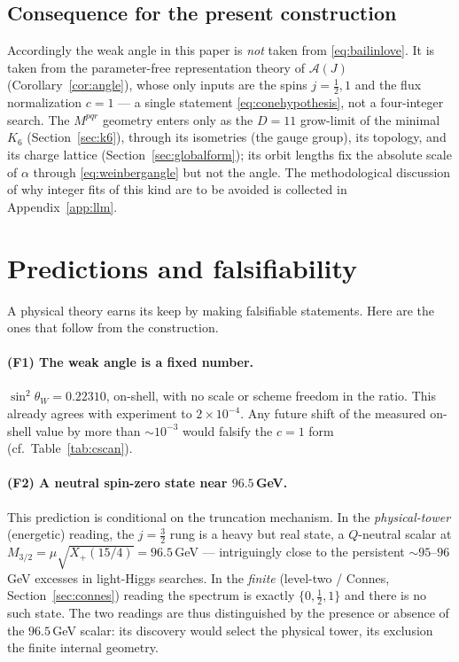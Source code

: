 \documentclass[11pt]{article}
\theoremstyle{plain}
\theoremstyle{definition}
\newcommand{\cA}{\mathcal{A}}
\newcommand{\Xp}{X_{+}}
\newcommand{\half}{\tfrac12}
\newcommand{\sinsq}{\sin^{2}\theta_W}
\begin{document}
\subsection{Consequence for the present construction}

Accordingly the weak angle in this paper is \emph{not} taken from
\eqref{eq:bailinlove}. It is taken from the parameter-free representation
theory of $\cA(J)$ (Corollary~\ref{cor:angle}), whose only inputs are the
spins $j=\half,1$ and the flux normalization $c=1$ --- a single statement
\eqref{eq:conehypothesis}, not a four-integer search. The $M^{pqr}$ geometry
enters only as the $D=11$ grow-limit of the minimal $K_6$
(Section~\ref{sec:k6}), through its isometries (the gauge group), its
topology, and its charge lattice
(Section~\ref{sec:globalform}); its orbit lengths fix the absolute scale of
$\alpha$ through \eqref{eq:weinbergangle} but not the angle. The methodological
discussion of why integer fits of this kind are to be avoided is collected in
Appendix~\ref{app:llm}.

\section{Predictions and falsifiability}
\label{sec:predictions}

A physical theory earns its keep by making falsifiable statements. Here are
the ones that follow from the construction.

\paragraph{(F1) The weak angle is a fixed number.}
$\sinsq=0.22310$, on-shell, with no scale or scheme freedom in the ratio.
This already agrees with experiment to $2\times10^{-4}$. Any future shift of
the measured on-shell value by more than $\sim10^{-3}$ would falsify the
$c=1$ form (cf.\ Table~\ref{tab:cscan}).

\paragraph{(F2) A neutral spin-zero state near $96.5\,$GeV.}
This prediction is conditional on the truncation mechanism. In the
\emph{physical-tower} (energetic) reading, the $j=\tfrac32$ rung is a heavy
but real state, a $Q$-neutral scalar at
$M_{3/2}=\mu\sqrt{\Xp(15/4)}=96.5\,$GeV --- intriguingly close to the
persistent $\sim95$--$96\,$GeV excesses in light-Higgs searches. In the
\emph{finite} (level-two / Connes, Section~\ref{sec:connes}) reading the
spectrum is exactly $\{0,\tfrac12,1\}$ and there is no such state. The two
readings are thus distinguished by the presence or absence of the $96.5\,$GeV
scalar: its discovery would select the physical tower, its exclusion the
finite internal geometry.
\end{document}
